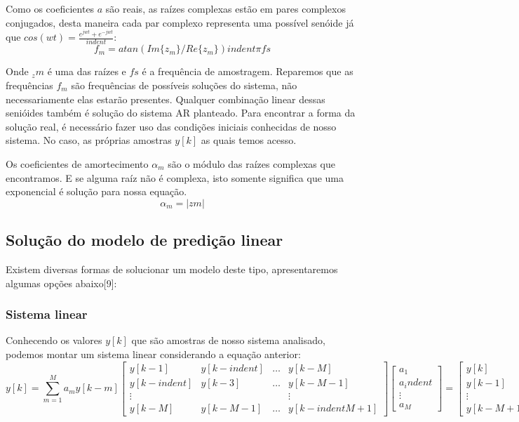 \documentclass[a4paper, 12pt]{book}
\begin{document}
\indent Como os coeficientes $a$  são reais, as raízes complexas estão em pares complexos conjugados, desta maneira cada par complexo representa uma possível senóide já que $cos(wt)=\frac{e^{jwt}+e^{-jwt}}{indent}$:
\begin{equation}
    f_m=atan(Im\{z_m\}/Re\{z_m\})indent\pi fs
\end{equation}

\indent Onde $_zm$ é uma das raízes e $fs$ é a frequência de amostragem.
\indent Reparemos que as frequências $f_m$ são frequências de possíveis soluções do sistema, não necessariamente elas estarão presentes. Qualquer combinação linear dessas senióides também é solução do sistema AR planteado. Para encontrar a forma da solução real, é  necessário fazer uso das condições iniciais conhecidas de nosso sistema. No caso, as próprias amostras $y[k]$ as quais temos acesso.

\indent Os coeficientes de amortecimento $\alpha_m$ são o módulo das raízes complexas que encontramos. E se alguma raíz não é complexa, isto somente significa que uma exponencial é solução para nossa equação.
\begin{equation}
    \alpha_m=|zm|
\end{equation}
\subsection{Solução do modelo de predição linear}

Existem diversas formas de solucionar um modelo deste tipo, apresentaremos algumas opções abaixo[9]:

\subsubsection{Sistema linear}

Conhecendo os valores $y[k]$ que são amostras de nosso sistema analisado, podemos montar um sistema linear considerando a equação anterior:
\begin{equation}
    y[k]=\sum_{m=1}^{M}a_m y[k-m]
    
    \begin{bmatrix}
    y[k-1] & y[k-indent] & \dots & y[k-M] \\
    y[k-indent] & y[k-3] & \dots & y[k-M-1] \\
    \vdots & & & \vdots\\
    y[k-M] & y[k-M-1] & \dots & y[k-indentM+1]
    \end{bmatrix}
    \begin{bmatrix}
    a_1 \\ a_indent \\ \vdots \\ a_M
    \end{bmatrix}
    =
    \begin{bmatrix}
    y[k] \\ y[k-1] \\ \vdots \\ y[k-M+1]
    \end{bmatrix}
    
\end{equation}
\end{document}
